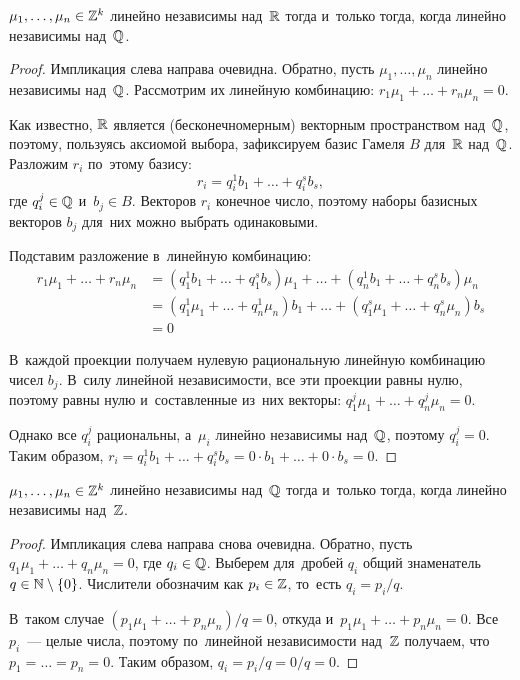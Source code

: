 \documentclass{article}
\begin{document}
\begin{lemma*}
    $\mu_1, \ldots, \mu_n \in \mathbb{Z}^k$ линейно независимы над~$\mathbb{R}$ тогда и~только тогда, когда линейно независимы над~$\mathbb{Q}$.
\end{lemma*}

\begin{proof}
    Импликация слева направа очевидна. Обратно, пусть $\mu_1, \ldots, \mu_n$ линейно независимы над~$\mathbb{Q}$.
    Рассмотрим их линейную комбинацию: $r_1 \mu_1 + \ldots + r_n \mu_n = 0$.

    Как известно, $\mathbb{R}$ является (бесконечномерным) векторным пространством над~$\mathbb{Q}$, поэтому, пользуясь аксиомой
    выбора, зафиксируем базис Гамеля $B$ для~$\mathbb{R}$ над~$\mathbb{Q}$. Разложим $r_i$ по~этому базису:
    $$
        r_i = q_i^1 b_1 + \ldots + q_i^s b_s,
    $$
    где $q_i^j \in \mathbb{Q}$ и~$b_j \in B$. Векторов $r_i$ конечное число, поэтому наборы базисных векторов $b_j$ для~них можно выбрать одинаковыми.

    Подставим разложение в~линейную комбинацию:
    \begin{align*}
        r_1 \mu_1 + \ldots + r_n \mu_n & = (q_1^1 b_1 + \ldots + q_1^s b_s) \mu_1 + \ldots + (q_n^1 b_1 + \ldots + q_n^s b_s) \mu_n \\
                                       & = (q_1^1 \mu_1 + \ldots + q_n^1 \mu_n) b_1 + \ldots + (q_1^s \mu_1 + \ldots + q_n^s \mu_n) b_s \\
                                       & = 0
    \end{align*}

    В~каждой проекции получаем нулевую рациональную линейную комбинацию чисел $b_j$. В~силу линейной независимости,
    все эти проекции равны нулю, поэтому равны нулю и~составленные из~них векторы: $q_1^j \mu_1 + \ldots + q_n^j \mu_n = 0$.

    Однако все $q_i^j$ рациональны, а~$\mu_i$ линейно независимы над~$\mathbb{Q}$, поэтому $q_i^j = 0$.
    Таким образом, $r_i = q_i^1 b_1 + \ldots + q_i^s b_s = 0 \cdot b_1 + \ldots + 0 \cdot b_s = 0$.
\end{proof}

\begin{lemma*}
    $\mu_1, \ldots, \mu_n \in \mathbb{Z}^k$ линейно независимы над~$\mathbb{Q}$ тогда и~только тогда, когда линейно независимы над~$\mathbb{Z}$.
\end{lemma*}

\begin{proof}
    Импликация слева направа снова очевидна. Обратно, пусть $q_1 \mu_1 + \ldots + q_n \mu_n = 0$, где $q_i \in \mathbb{Q}$.
    Выберем для~дробей $q_i$ общий знаменатель $q \in \mathbb{N} \setminus \{ 0 \}$. Числители обозначим как $p_i \in \mathbb{Z}$, то~есть $q_i = p_i / q$.

    В~таком случае $(p_1 \mu_1 + \ldots + p_n \mu_n) / q = 0$, откуда и~$p_1 \mu_1 + \ldots + p_n \mu_n = 0$.
    Все $p_i$~— целые числа, поэтому по~линейной независимости над~$\mathbb{Z}$ получаем, что $p_1 = \ldots = p_n = 0$.
    Таким образом, $q_i = p_i / q = 0 / q = 0$.
\end{proof}
\end{document}
